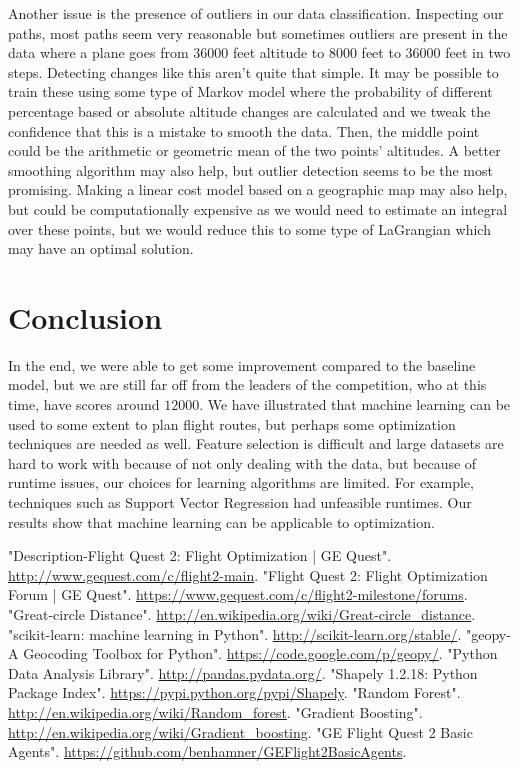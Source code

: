 \documentclass{article}[12pt]
\begin{document}
\begin{multicols}{2}
Another issue is the presence of outliers in our data classification. Inspecting our paths, most paths seem very reasonable but sometimes outliers are present in the data where a plane goes from 36000 feet altitude to 8000 feet to 36000 feet in two steps. Detecting changes like this aren't quite that simple. It may be possible to train these using some type of Markov model where the probability of different percentage based or absolute altitude changes are calculated and we tweak the confidence that this is a mistake to smooth the data. Then, the middle point could be the arithmetic or geometric mean of the two points' altitudes. A better smoothing algorithm may also help, but outlier detection seems to be the most promising. Making a linear cost model based on a geographic map may also help, but could be computationally expensive as we would need to estimate an integral over these points, but we would reduce this to some type of LaGrangian which may have an optimal solution.

\section{Conclusion}
In the end, we were able to get some improvement compared to the baseline model, but we are still far off from the leaders of the competition, who at this time, have scores around $12000$. We have illustrated that machine learning can be used to some extent to plan flight routes, but perhaps some optimization techniques are needed as well. Feature selection is difficult and large datasets are hard to work with because of not only dealing with the data, but because of runtime issues, our choices for learning algorithms are limited. For example, techniques such as Support Vector Regression had unfeasible runtimes. Our results show that machine learning can be applicable to optimization.


\begin{thebibliography}{1}

 "Description-Flight Quest 2: Flight Optimization | GE Quest". \url{http://www.gequest.com/c/flight2-main}.
 "Flight Quest 2: Flight Optimization Forum | GE Quest". \url{https://www.gequest.com/c/flight2-milestone/forums}.
 "Great-circle Distance". \url{http://en.wikipedia.org/wiki/Great-circle_distance}.
 "scikit-learn: machine learning in Python". \url{http://scikit-learn.org/stable/}.
 "geopy-A Geocoding Toolbox for Python". \url{https://code.google.com/p/geopy/}.
 "Python Data Analysis Library". \url{http://pandas.pydata.org/}.
 "Shapely 1.2.18: Python Package Index". \url{https://pypi.python.org/pypi/Shapely}.
 "Random Forest". \url{http://en.wikipedia.org/wiki/Random_forest}.
 "Gradient Boosting". \url{http://en.wikipedia.org/wiki/Gradient_boosting}.
 "GE Flight Quest 2 Basic Agents". \url{https://github.com/benhamner/GEFlight2BasicAgents}.
\end{thebibliography}
\end{multicols}
\end{document}
